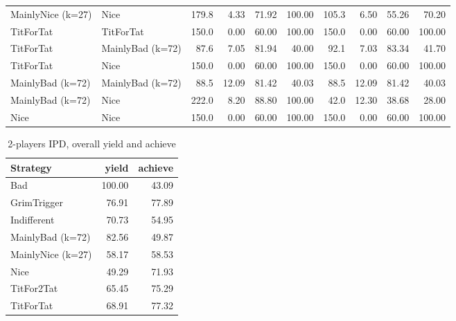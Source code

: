 \documentclass[journal,10pt,twoside]{IEEEtran}
\begin{document}
\begin{table}[ht]
\begin{tabular}{ll|rrrr|rrrr}
        MainlyNice (k=27) & Nice              & 179.8 &  4.33 &  71.92 &     100.00 & 105.3 &  6.50 &  55.26 &      70.20 \\
        TitForTat         & TitForTat         & 150.0 &  0.00 &  60.00 &     100.00 & 150.0 &  0.00 &  60.00 &     100.00 \\
        TitForTat         & MainlyBad (k=72)  &  87.6 &  7.05 &  81.94 &      40.00 &  92.1 &  7.03 &  83.34 &      41.70 \\
        TitForTat         & Nice              & 150.0 &  0.00 &  60.00 &     100.00 & 150.0 &  0.00 &  60.00 &     100.00 \\
        MainlyBad (k=72)  & MainlyBad (k=72)  &  88.5 & 12.09 &  81.42 &      40.03 &  88.5 & 12.09 &  81.42 &      40.03 \\
        MainlyBad (k=72)  & Nice              & 222.0 &  8.20 &  88.80 &     100.00 &  42.0 & 12.30 &  38.68 &      28.00 \\
        Nice              & Nice              & 150.0 &  0.00 &  60.00 &     100.00 & 150.0 &  0.00 &  60.00 &     100.00 \\ \bottomrule
    \end{tabular}
\end{table}

\begin{table}[ht]
    \caption{2-players IPD, overall yield and achieve}
    \label{tab:ipd2pavg}
    \centering
    \begin{tabular}{l|rr} \toprule
        Strategy          &  yield & achieve \\ \midrule
        Bad               & 100.00 &   43.09 \\
        GrimTrigger       &  76.91 &   77.89 \\
        Indifferent       &  70.73 &   54.95 \\
        MainlyBad (k=72)  &  82.56 &   49.87 \\
        MainlyNice (k=27) &  58.17 &   58.53 \\
        Nice              &  49.29 &   71.93 \\
        TitFor2Tat        &  65.45 &   75.29 \\
        TitForTat         &  68.91 &   77.32 \\ \bottomrule
    \end{tabular}
\end{table}
\end{document}
